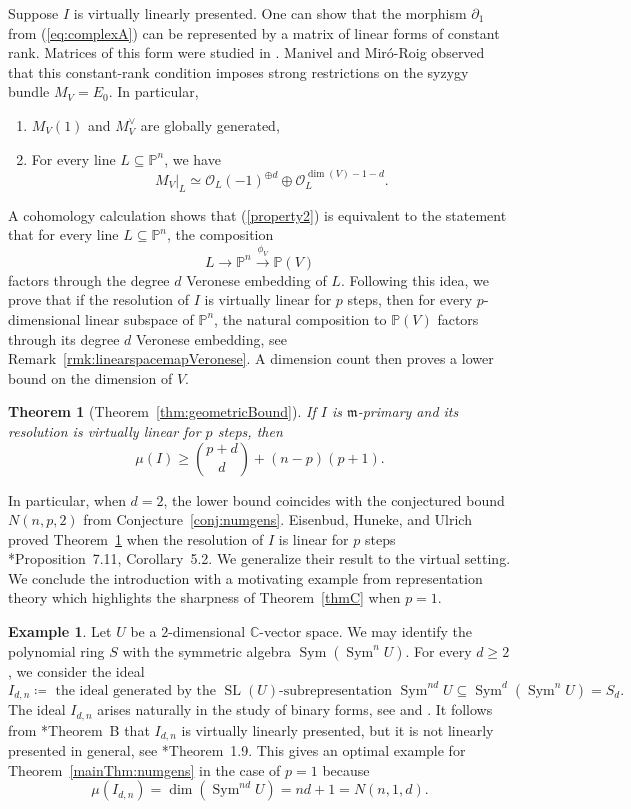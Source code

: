 \documentclass[11pt,letterpaper,reqno]{amsart}
\newcommand{\CC}{\mathbb{C}}
\newcommand{\m}{\mathfrak{m}}
\newcommand{\SL}{\operatorname{SL}}
\newcommand{\Sym}{\operatorname{Sym}}
\newcommand{\mc}[1]{\mathcal{#1}}
\def\PP{{\mathbb P}}
\def\lra{\longrightarrow}
\newtheorem{thmx}{Theorem}
\theoremstyle{definition}
\newtheorem{example}[theorem]{Example}
\numberwithin{equation}{section}
\begin{document}
Suppose $I$ is virtually linearly presented. One can show that the morphism $\partial_1$ from (\ref{eq:complexA}) can be represented by a matrix of linear forms of constant rank. Matrices of this form were studied in \cite{MRM}. Manivel and Mir\'o-Roig observed that this constant-rank condition imposes strong restrictions on the syzygy bundle $M_V = E_0$. In particular,
\begin{enumerate}
    \item $M_V(1)$ and $M_V^\vee$ are globally generated,
    \item\label{property2} For every line $L \subseteq \PP^n$, we have
    \[M_V|_L \simeq \mc{O}_L(-1)^{\oplus d} \oplus \mc{O}_{L}^{\dim(V) - 1 - d}.\]
\end{enumerate}
A cohomology calculation shows that (\ref{property2}) is equivalent to the statement that for every line $L \subseteq \PP^n$, the composition
\[L \lra \PP^n \overset{\phi_V}{\lra} \PP(V)\]
factors through the degree $d$ Veronese embedding of $L$. Following this idea, we prove that if the resolution of $I$ is virtually linear for $p$ steps, then for every $p$-dimensional linear subspace of $\PP^n$, the natural composition to $\PP(V)$ factors through its degree $d$ Veronese embedding, see Remark~\ref{rmk:linearspacemapVeronese}. A dimension count then proves a lower bound on the dimension of $V$.
\begin{thmx}[Theorem~\ref{thm:geometricBound}]\label{thm:D}
    If $I$ is $\m$-primary and its resolution is virtually linear for $p$ steps, then 
    \[\mu(I) \ge \binom{p+d}{d} + (n-p)(p+1).\]
\end{thmx}
\noindent In particular, when $d = 2$, the lower bound coincides with the conjectured bound $N(n,p,2)$ from Conjecture~\ref{conj:numgens}. Eisenbud, Huneke, and Ulrich proved Theorem~\ref{thm:D} when the resolution of $I$ is linear for $p$ steps \cite{EHU}*{Proposition~7.11, Corollary~5.2}. We generalize their result to the virtual setting. We conclude the introduction with a motivating example from representation theory which highlights the sharpness of Theorem~\ref{thmC}  when $p = 1$.
\begin{example}
    Let $U$ be a $2$-dimensional $\CC$-vector space. We may identify the polynomial ring $S$ with the symmetric algebra $\Sym(\Sym^n U)$. For every $d \ge 2$, we consider the ideal
    \[I_{d,n} \coloneqq \text{ the ideal generated by the }\SL(U)\text{-subrepresentation }\Sym^{nd} U \subseteq \Sym^d(\Sym^n U) = S_d.\]
    The ideal $I_{d,n}$ arises naturally in the study of binary forms, see \cite{RSWY} and \cite{weyman-mult}. It follows from \cite{BFL}*{Theorem~B} that $I_{d,n}$ is virtually linearly presented, but it is not linearly presented in general, see \cite{RSWY}*{Theorem~1.9}. This gives an optimal example for Theorem~\ref{mainThm:numgens} in the case of $p = 1$ because 
    \[\mu(I_{d,n}) = \dim(\Sym^{nd} U) = nd+1 = N(n,1,d).\]
\end{example}
\end{document}
